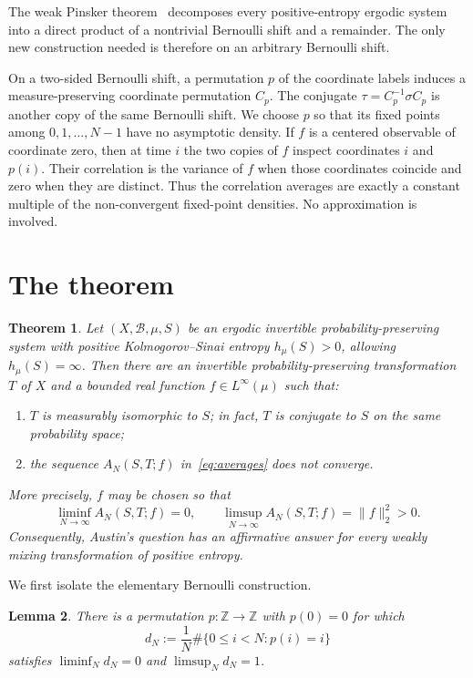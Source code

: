 \documentclass[11pt]{article}
\newtheorem{theorem}{Theorem}
\newtheorem{lemma}[theorem]{Lemma}
\newcommand{\Z}{\mathbb Z}
\begin{document}
The weak Pinsker theorem~\cite{AustinPinsker} decomposes every
positive-entropy ergodic system into a direct product of a nontrivial Bernoulli
shift and a remainder.  The only new construction needed is therefore on an
arbitrary Bernoulli shift.

On a two-sided Bernoulli shift, a permutation $p$ of the coordinate labels
induces a measure-preserving coordinate permutation $C_p$.  The conjugate
$\tau=C_p^{-1}\sigma C_p$ is another copy of the same Bernoulli shift.  We
choose $p$ so that its fixed points among $0,1,\ldots,N-1$ have no asymptotic
density.  If $f$ is a centered observable of coordinate zero, then at time $i$
the two copies of $f$ inspect coordinates $i$ and $p(i)$.  Their correlation is
the variance of $f$ when those coordinates coincide and zero when they are
distinct.  Thus the correlation averages are exactly a constant multiple of
the non-convergent fixed-point densities.  No approximation is involved.

\section{The theorem}

\begin{theorem}\label{thm:main}
Let $(X,\mathcal B,\mu,S)$ be an ergodic invertible
probability-preserving system with positive Kolmogorov--Sinai entropy
$h_\mu(S)>0$, allowing $h_\mu(S)=\infty$.  Then there are an invertible
probability-preserving transformation $T$ of $X$ and a bounded real function
$f\in L^\infty(\mu)$ such that:
\begin{enumerate}
\item $T$ is measurably isomorphic to $S$; in fact, $T$ is conjugate to $S$ on
the same probability space;
\item the sequence $A_N(S,T;f)$ in~\eqref{eq:averages} does not converge.
\end{enumerate}
More precisely, $f$ may be chosen so that
\[
 \liminf_{N\to\infty}A_N(S,T;f)=0,
 \qquad
 \limsup_{N\to\infty}A_N(S,T;f)=\|f\|_2^2>0.
\]
Consequently, Austin's question has an affirmative answer for every weakly
mixing transformation of positive entropy.
\end{theorem}

We first isolate the elementary Bernoulli construction.

\begin{lemma}\label{lem:permutation}
There is a permutation $p:\Z\to\Z$ with $p(0)=0$ for which
\[
 d_N:=\frac1N\#\{0\leq i<N:p(i)=i\}
\]
satisfies $\liminf_N d_N=0$ and $\limsup_N d_N=1$.
\end{lemma}
\end{document}
